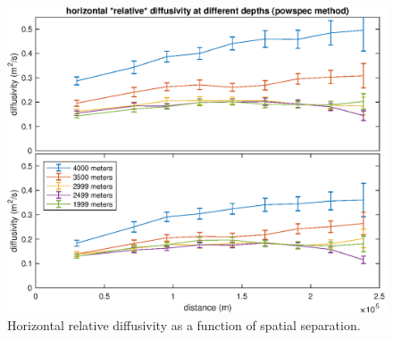 \documentclass[10pt]{article}
\begin{document}
\begin{figure}[t]
  \centerline{\includegraphics[width=39pc,angle=0]{figures/DiffusivityVsScaleLinNonlin}}
  \caption{Horizontal relative diffusivity as a function of spatial separation.}
  \label{DiffusivityVsScaleLinNonlin}
\end{figure}

{}
{\clearpage}


\end{document}
